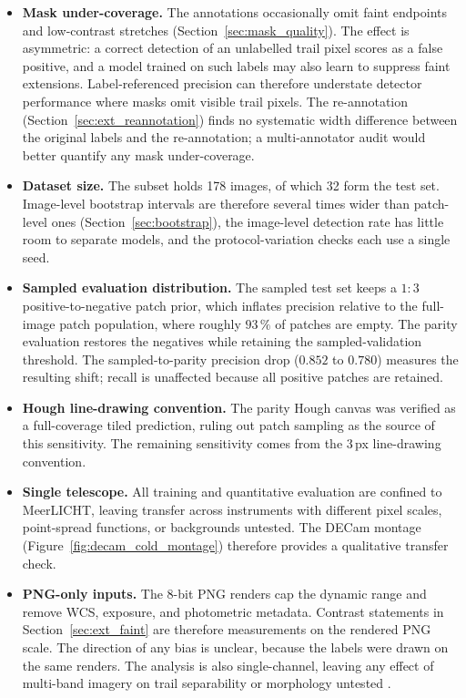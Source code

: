 \documentclass{cam-thesis}
\begin{document}
\begin{itemize}
  \item \textbf{Mask under-coverage.} The annotations occasionally omit
        faint endpoints and low-contrast stretches
        (Section~\ref{sec:mask_quality}). The effect is asymmetric: a correct
        detection of an unlabelled trail pixel scores as a false positive,
        and a model trained on such labels may also learn to suppress faint
        extensions. Label-referenced precision can therefore understate detector
        performance where masks omit visible trail pixels. The re-annotation
        (Section~\ref{sec:ext_reannotation}) finds no systematic width difference
        between the original labels and the re-annotation; a multi-annotator
        audit would better quantify any mask under-coverage.
  \item \textbf{Dataset size.} The subset holds 178 images, of which 32 form
        the test set. Image-level bootstrap intervals are therefore several
        times wider than patch-level ones (Section~\ref{sec:bootstrap}), the
        image-level detection rate has little room to separate models, and the
        protocol-variation checks each use a single seed.
  \item \textbf{Sampled evaluation distribution.} The sampled test set keeps
        a $1{:}3$ positive-to-negative patch prior, which inflates precision
        relative to the full-image patch population, where roughly $93\,\%$ of
        patches are empty. The
        parity evaluation restores the negatives while retaining the
        sampled-validation threshold. The sampled-to-parity precision drop
        ($0.852$ to $0.780$) measures the resulting shift; recall is
        unaffected because all positive patches are retained.
  \item \textbf{Hough line-drawing convention.} The parity Hough canvas was
        verified as a full-coverage tiled prediction, ruling out patch sampling
        as the source of this sensitivity. The remaining sensitivity comes from
        the $3$\,px line-drawing convention.
  \item \textbf{Single telescope.} All training and quantitative evaluation
        are confined to MeerLICHT, leaving transfer across instruments with
        different pixel scales, point-spread functions, or backgrounds
        untested. The DECam montage
        (Figure~\ref{fig:decam_cold_montage}) therefore provides a qualitative
        transfer check.
  \item \textbf{PNG-only inputs.} The 8-bit PNG renders cap the dynamic range
        and remove WCS, exposure, and photometric metadata. Contrast statements
        in Section~\ref{sec:ext_faint} are therefore measurements on the
        rendered PNG scale.
        The direction of any bias is unclear, because the labels were drawn
        on the same renders. The analysis is also single-channel, leaving any
        effect of multi-band imagery on trail separability or morphology
        untested \citep{yu2025}.
\end{itemize}
\end{document}
